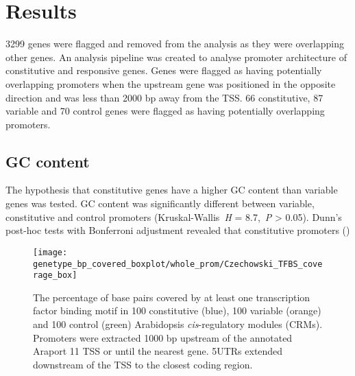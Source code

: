 \section{Results}\label{chapter1:results}

3299 genes were flagged and removed from the analysis as they were overlapping other genes.
An analysis pipeline was created to analyse promoter architecture of constitutive and responsive genes.
Genes were flagged as having potentially overlapping promoters when the upstream gene was positioned in the opposite direction and was less than 2000 bp away from the TSS.
66 constitutive, 87 variable and 70 control genes were flagged as having potentially overlapping promoters.


\subsection{GC content}

The hypothesis that constitutive genes have a higher GC content than variable genes was tested.
GC content was significantly different between variable, constitutive and control promoters (Kruskal\hyp{}Wallis~\textit{H} = 8.7,~\textit{P} \textgreater{} 0.05). Dunn's post\hyp{}hoc tests with Bonferroni adjustment revealed that constitutive promoters ()



\begin{figure}[!h]
	\begin{center}
		\capstart
		\texttt{[image: genetype\_bp\_covered\_boxplot/whole\_prom/Czechowski\_TFBS\_coverage\_box]}
		\caption{
			The percentage of base pairs covered by at least one transcription
			factor binding motif in 100 constitutive (blue), 100 variable (orange) and 100 control (green)
			Arabidopsis \textit{cis}\hyp{}regulatory modules (CRMs). Promoters were extracted 1000 bp upstream of the
			annotated Araport 11 \autocite{chengAraport11CompleteReannotation2017} TSS or until the nearest gene. 5UTRs extended downstream of the TSS to the closest coding region.
			\label{fig:bp-covered-wholeprom}
		}
	\end{center}
\end{figure}
